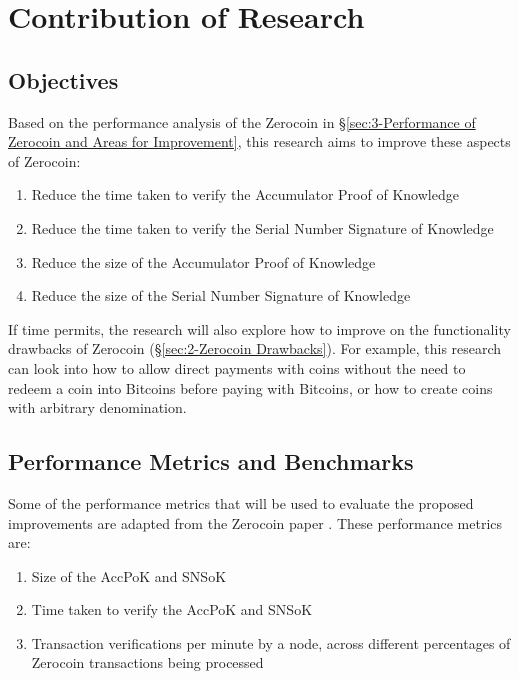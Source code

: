 \ifpdf
\graphicspath{{Chapter4/Figs/}}
\else
\graphicspath{{Chapter4/Figs/}}
\fi

\chapter{Contribution of Research}
\section{Objectives}
\label{sec:4-Contribution of Research Objectives}
Based on the performance analysis of the Zerocoin in \S\ref{sec:3-Performance of Zerocoin and Areas for Improvement}, this research aims to improve these aspects of Zerocoin: 

\begin{enumerate}
	\item Reduce the time taken to verify the Accumulator Proof of Knowledge
	\item Reduce the time taken to verify the Serial Number Signature of Knowledge
	\item Reduce the size of the Accumulator Proof of Knowledge
	\item Reduce the size of the Serial Number Signature of Knowledge
\end{enumerate}

If time permits, the research will also explore how to improve on the functionality drawbacks of Zerocoin (\S\ref{sec:2-Zerocoin Drawbacks}). For example, this research can look into how to allow direct payments with coins without the need to redeem a coin into Bitcoins before paying with Bitcoins, or how to create coins with arbitrary denomination.

\section{Performance Metrics and Benchmarks}
\label{sec:4-Performance Metrics and Benchmarks}
Some of the performance metrics that will be used to evaluate the proposed improvements are adapted from the Zerocoin paper \cite{Miers2013}. These performance metrics are:

\begin{enumerate}
	\item Size of the AccPoK and SNSoK
	\item Time taken to verify the AccPoK and SNSoK
	\item Transaction verifications per minute by a node, across different percentages of Zerocoin transactions being processed
\end{enumerate}


